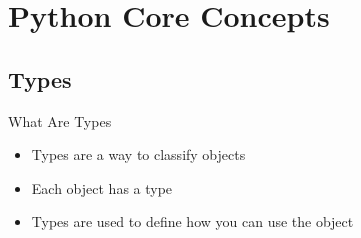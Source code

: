 \documentclass[aspectratio=169]{beamer}
\begin{document}
\section{Python Core Concepts}

\subsection{Types}

\begin{frame}{What Are Types}

    \begin{itemize}
        \item Types are a way to classify objects
        \item Each object has a type
        \item Types are used to define how you can use the object
    \end{itemize}

\end{frame}
\end{document}
